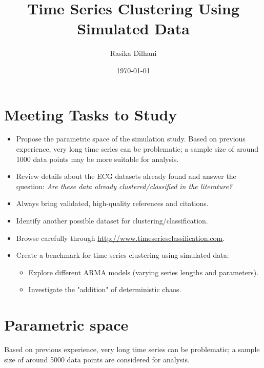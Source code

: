 \documentclass[12pt,a4paper]{article}
\title{Time Series Clustering Using Simulated Data}
\author{Rasika Dilhani}
\date{\today}
\begin{document}
	\maketitle
	
	\section*{Meeting Tasks to Study}
	
	\begin{itemize}
		\item Propose the parametric space of the simulation study.  
		Based on previous experience, very long time series can be problematic; a sample size of around 1000 data points may be more suitable for analysis.
		
		\item Review details about the ECG datasets already found and answer the question:  
		\textit{Are these data already clustered/classified in the literature?}
		
		\item Always bring validated, high-quality references and citations.
		
		\item Identify another possible dataset for clustering/classification.
		
		\item Browse carefully through \url{http://www.timeseriesclassification.com}.
		
		\item Create a benchmark for time series clustering using simulated data:
		\begin{itemize}
			\item Explore different ARMA models (varying series lengths and parameters).
			\item Investigate the "addition" of deterministic chaos.
		\end{itemize}
		
	\end{itemize}

	
\section{Parametric space}
  
Based on previous experience, very long time series can be problematic; a sample size of around 5000 data points are considered for analysis.
\end{document}
